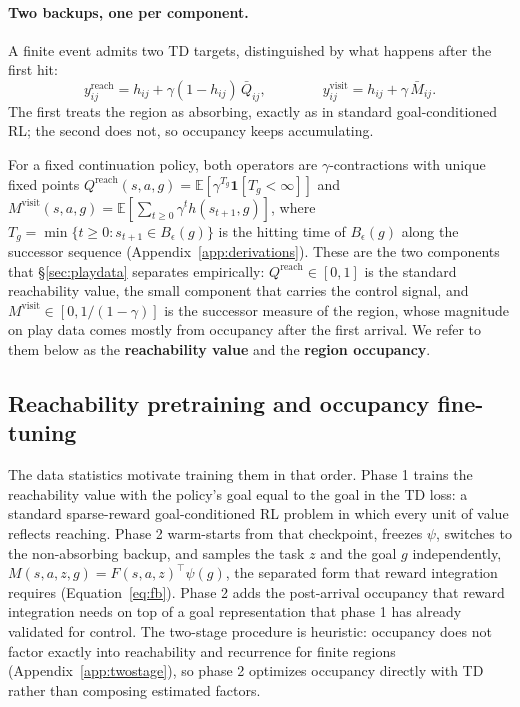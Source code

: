 \documentclass{article}
\newcommand{\E}{\mathbb{E}}
\newcommand{\ind}[1]{\mathbf{1}\!\left[#1\right]}
\newcommand{\Reach}{\mathrm{reach}}
\newcommand{\Visit}{\mathrm{visit}}
\begin{document}
\paragraph{Two backups, one per component.}
A finite event admits two TD targets, distinguished by what happens after the first hit:
\begin{equation}
\label{eq:backups}
y^{\Reach}_{ij}=h_{ij}+\gamma(1-h_{ij})\,\bar Q_{ij}, \qquad\qquad y^{\Visit}_{ij}=h_{ij}+\gamma\,\bar M_{ij}.
\end{equation}
The first treats the region as absorbing, exactly as in standard goal-conditioned RL; the second does not, so occupancy keeps accumulating.

For a fixed continuation policy, both operators are $\gamma$-contractions with unique fixed points $Q^{\Reach}(s,a,g)=\E[\gamma^{T_g}\ind{T_g<\infty}]$ and $M^{\Visit}(s,a,g)=\E[\sum_{t\ge0}\gamma^t h(s_{t+1},g)]$, where $T_g=\min\{t\ge 0: s_{t+1}\in B_\epsilon(g)\}$ is the hitting time of $B_\epsilon(g)$ along the successor sequence (Appendix~\ref{app:derivations}).
These are the two components that \S\ref{sec:playdata} separates empirically: $Q^{\Reach}\in[0,1]$ is the standard reachability value, the small component that carries the control signal, and $M^{\Visit}\in[0,1/(1-\gamma)]$ is the successor measure of the region, whose magnitude on play data comes mostly from occupancy after the first arrival.
We refer to them below as the \textbf{reachability value} and the \textbf{region occupancy}.

\subsection{Reachability pretraining and occupancy fine-tuning}

The data statistics motivate training them in that order.
Phase 1 trains the reachability value with the policy's goal equal to the goal in the TD loss: a standard sparse-reward goal-conditioned RL problem in which every unit of value reflects reaching.
Phase 2 warm-starts from that checkpoint, freezes $\psi$, switches to the non-absorbing backup, and samples the task $z$ and the goal $g$ independently, $M(s,a,z,g)=F(s,a,z)^{\top}\psi(g)$, the separated form that reward integration requires (Equation~\ref{eq:fb}).
Phase 2 adds the post-arrival occupancy that reward integration needs on top of a goal representation that phase 1 has already validated for control.
The two-stage procedure is heuristic: occupancy does not factor exactly into reachability and recurrence for finite regions (Appendix~\ref{app:twostage}), so phase 2 optimizes occupancy directly with TD rather than composing estimated factors.
\end{document}
